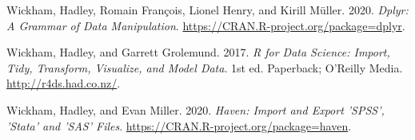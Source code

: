 \documentclass[
  letterpaper,
  DIV=11,
  numbers=noendperiod]{scrreprt}
\newlength{\cslhangindent}
\newlength{\cslentryspacingunit} %
\newenvironment{CSLReferences}[2] %
 {%
  \setlength{\parindent}{0pt}
  \ifodd #1
  \let\oldpar\par
  \def\par{\hangindent=\cslhangindent\oldpar}
  \fi
  \setlength{\parskip}{#2\cslentryspacingunit}
 }%
 {}
\begin{document}
\begin{CSLReferences}{1}{0}
\leavevmode{}%
Wickham, Hadley, Romain François, Lionel Henry, and Kirill Müller. 2020.
\emph{Dplyr: A Grammar of Data Manipulation}.
\url{https://CRAN.R-project.org/package=dplyr}.

\leavevmode{}%
Wickham, Hadley, and Garrett Grolemund. 2017. \emph{R for Data Science:
Import, Tidy, Transform, Visualize, and Model Data}. 1st ed. Paperback;
O'Reilly Media. \url{http://r4ds.had.co.nz/}.

\leavevmode{}%
Wickham, Hadley, and Evan Miller. 2020. \emph{Haven: Import and Export
'SPSS', 'Stata' and 'SAS' Files}.
\url{https://CRAN.R-project.org/package=haven}.

\end{CSLReferences}
\end{document}
